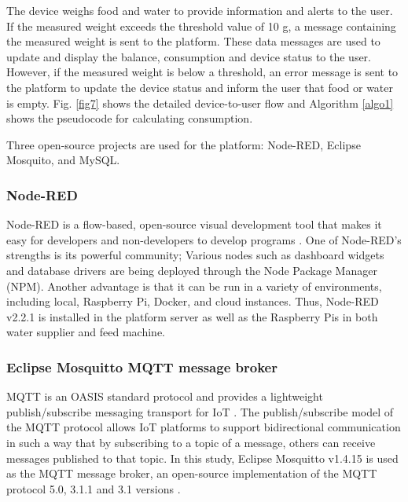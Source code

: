 \documentclass[conference]{IEEEtran}
\begin{document}
The device weighs food and water to provide information and alerts to the user. 
If the measured weight exceeds the threshold value of 10 g, a message containing the measured weight is sent to the platform. 
These data messages are used to update and display the balance, consumption and device status to the user.
However, if the measured weight is below a threshold, an error message is sent to the platform to update the device status and inform the user that food or water is empty.
Fig. \ref{fig7} shows the detailed device-to-user flow and Algorithm \ref{algo1} shows the pseudocode for calculating consumption.

Three open-source projects are used for the platform: Node-RED, Eclipse Mosquito, and MySQL. 
\subsubsection{Node-RED}
Node-RED is a flow-based, open-source visual development tool that makes it easy for developers and non-developers to develop programs \cite{b12}.
One of Node-RED's strengths is its powerful community; Various nodes such as dashboard widgets and database drivers are being deployed through the Node Package Manager (NPM).
Another advantage is that it can be run in a variety of environments, including local, Raspberry Pi, Docker, and cloud instances.
Thus, Node-RED v2.2.1 is installed in the platform server as well as the Raspberry Pis in both water supplier and feed machine.

\subsubsection{Eclipse Mosquitto MQTT message broker}
MQTT is an OASIS standard protocol and provides a lightweight publish/subscribe messaging transport for IoT \cite{b8}.
The publish/subscribe model of the MQTT protocol allows IoT platforms to support bidirectional communication in such a way that by subscribing to a topic of a message, others can receive messages published to that topic.
In this study, Eclipse Mosquitto v1.4.15 is used as the MQTT message broker, an open-source implementation of the MQTT protocol 5.0, 3.1.1 and 3.1 versions \cite{b13}.
\end{document}
